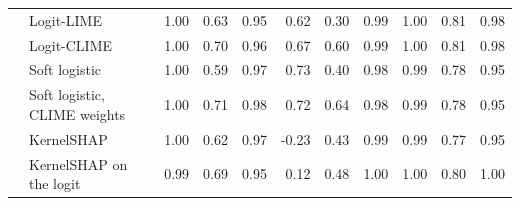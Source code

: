 \begin{tabular}{@{}llrrrrrrrrr@{}}
   & Logit-LIME & 1.00 & 0.63 & 0.95 & 0.62 & 0.30 & 0.99 & 1.00 & 0.81 & 0.98 \\
   & Logit-CLIME & 1.00 & 0.70 & 0.96 & 0.67 & 0.60 & 0.99 & 1.00 & 0.81 & 0.98 \\
   & Soft logistic & 1.00 & 0.59 & 0.97 & 0.73 & 0.40 & 0.98 & 0.99 & 0.78 & 0.95 \\
   & Soft logistic, CLIME weights & 1.00 & 0.71 & 0.98 & 0.72 & 0.64 & 0.98 & 0.99 & 0.78 & 0.95 \\
   & KernelSHAP & 1.00 & 0.62 & 0.97 & -0.23 & 0.43 & 0.99 & 0.99 & 0.77 & 0.95 \\
   & KernelSHAP on the logit & 0.99 & 0.69 & 0.95 & 0.12 & 0.48 & 1.00 & 1.00 & 0.80 & 1.00 \\
  \bottomrule
\end{tabular}
